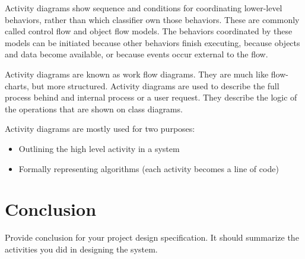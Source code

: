 Activity diagrams show sequence and conditions for coordinating lower-level behaviors, rather than which classifier own those behaviors. These are commonly called control flow and object flow models. The behaviors coordinated by these models can be initiated because other behaviors finish executing, because objects and data become available, or because events occur external to the flow.

Activity diagrams are known as work flow diagrams. They are much like flow-charts, but more structured. Activity diagrams are used to describe the full process behind and internal process or a user request. They describe the logic of the operations that are shown on class diagrams.

Activity diagrams are mostly used for two purposes:
\begin{itemize}
	\item Outlining the high level activity in a system
	\item Formally representing algorithms (each activity becomes a line of code)
\end{itemize}

\section{Conclusion} %
Provide conclusion for your project design specification. It should summarize the activities you did in designing the system.
